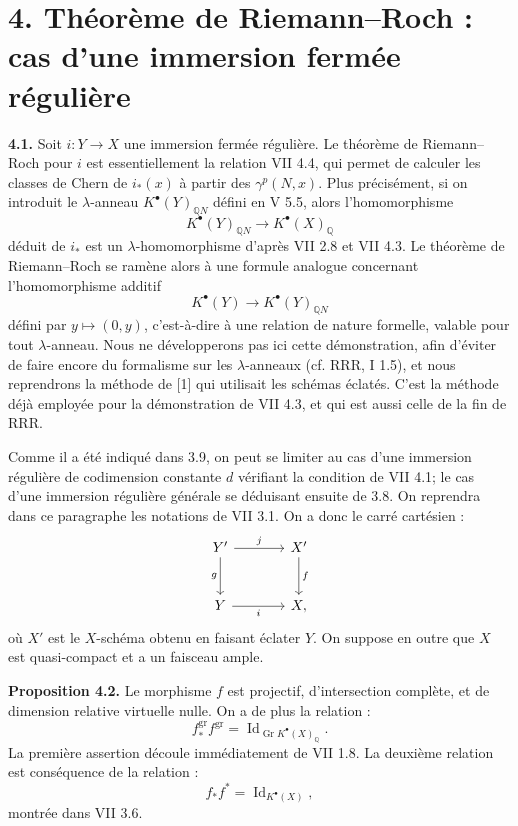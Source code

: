 \documentclass[11pt]{article}
\newcommand{\Gr}{\operatorname{Gr}}
\newcommand{\RRR}{\mathrm{RRR}}
\providecommand{\Gr}{\operatorname{Gr}}
\providecommand{\Gr}{\operatorname{G}}
\begin{document}
\section*{4. Théorème de Riemann--Roch : cas d'une immersion fermée régulière}

\textbf{4.1.} Soit \(i:Y\to X\) une immersion fermée régulière. Le théorème de Riemann--Roch pour \(i\) est essentiellement la relation VII 4.4, qui permet de calculer les classes de Chern de \(i_*(x)\) à partir des \(\gamma^p(N,x)\). Plus précisément, si on introduit le \(\lambda\)-anneau \(K^{\bullet}(Y)_{\mathbb Q N}\) défini en V 5.5, alors l'homomorphisme
\[
K^{\bullet}(Y)_{\mathbb Q N}\longrightarrow K^{\bullet}(X)_{\mathbb Q}
\]
déduit de \(i_*\) est un \(\lambda\)-homomorphisme d'après VII 2.8 et VII 4.3. Le théorème de Riemann--Roch se ramène alors à une formule analogue concernant l'homomorphisme additif
\[
K^{\bullet}(Y)\longrightarrow K^{\bullet}(Y)_{\mathbb Q N}
\]
défini par \(y\mapsto(0,y)\), c'est-à-dire à une relation de nature formelle, valable pour tout \(\lambda\)-anneau. Nous ne développerons pas ici cette démonstration, afin d'éviter de faire encore du formalisme sur les \(\lambda\)-anneaux (cf. \(\RRR\), I 1.5), et nous reprendrons la méthode de [1] qui utilisait les schémas éclatés. C'est la méthode déjà employée pour la démonstration de VII 4.3, et qui est aussi celle de la fin de \(\RRR\).

Comme il a été indiqué dans 3.9, on peut se limiter au cas d'une immersion régulière de codimension constante \(d\) vérifiant la condition de VII 4.1; le cas d'une immersion régulière générale se déduisant ensuite de 3.8. On reprendra dans ce paragraphe les notations de VII 3.1. On a donc le carré cartésien :
\[
\begin{tikzcd}[column sep=large,row sep=large]
Y' \arrow[r,"j"] \arrow[d,"g"'] & X' \arrow[d,"f"]\\
Y \arrow[r,"i"'] & X ,
\end{tikzcd}
\]
où \(X'\) est le \(X\)-schéma obtenu en faisant éclater \(Y\). On suppose en outre que \(X\) est quasi-compact et a un faisceau ample.

\textbf{Proposition 4.2.} Le morphisme \(f\) est projectif, d'intersection complète, et de dimension relative virtuelle nulle. On a de plus la relation :
\[
 f^{\mathrm{gr}}_* f^{\mathrm{gr}}=\operatorname{Id}_{\Gr K^{\bullet}(X)_{\mathbb Q}} .
\]
La première assertion découle immédiatement de VII 1.8. La deuxième relation est conséquence de la relation :
\[
 f_*f^*=\operatorname{Id}_{K^{\bullet}(X)},
\]
montrée dans VII 3.6.
\end{document}
